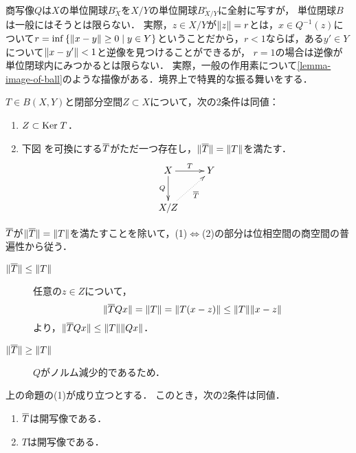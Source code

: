\documentclass[uplatex,dvipdfmx]{jsreport}
\begin{document}
\begin{remark}[連続延長の失敗と単位閉球のコンパクト性]
    商写像$Q$は$X$の単位開球$B_X^\circ$を$X/Y$の単位開球$B_{X/Y}^\circ$に全射に写すが，
    単位閉球$B$は一般にはそうとは限らない．
    実際，$z\in X/Y$が$\|z\|=r$とは，$x\in Q^{-1}(z)$について$r=\inf\left\{\|x-y\|\ge 0\mid y\in Y\right\}$ということだから，$r<1$ならば，ある$y'\in Y$について$\|x-y'\|<1$と逆像を見つけることができるが，
    $r=1$の場合は逆像が単位閉球内にみつかるとは限らない．
    実際，一般の作用素について\ref{lemma-image-of-ball}のような描像がある．境界上で特異的な振る舞いをする．
\end{remark}

\begin{proposition}[商空間の普遍性]
    $T\in B(X,Y)$と閉部分空間$Z\subset X$について，次の2条件は同値：
    \begin{enumerate}
        \item $Z\subset\mathrm{Ker}\; T$．
        \item 下図
        を可換にする$\overline{T}$がただ一つ存在し，$\|\overline{T}\|=\|T\|$を満たす．
        \[\xymatrix{
            X\ar[r]^-T\ar[d]_-Q&Y\\
            X/Z\ar@{.>}[ur]_-{\o{T}}
        }\]
    \end{enumerate}
\end{proposition}
\begin{Proof}
    $\overline{T}$が$\|\overline{T}\|=\|T\|$を満たすことを除いて，(1)$\Leftrightarrow$(2)の部分は位相空間の商空間の普遍性から従う．
    \begin{description}
        \item[$\|\overline{T}\|\le\|T\|$] 任意の$z\in Z$について，
        \[\|\overline{T}Qx\|=\|T\|=\|T(x-z)\|\le\|T\|\|x-z\|\]
        より，$\|\overline{T}Qx\|\le\|T\|\|Qx\|$．
        \item[$\|\overline{T}\|\ge\|T\|$] $Q$がノルム減少的であるため．
    \end{description}
\end{Proof}

\begin{proposition}
    上の命題の(1)が成り立つとする．
    このとき，次の2条件は同値．
    \begin{enumerate}
        \item $\overline{T}$は開写像である．
        \item $T$は開写像である．
    \end{enumerate}
\end{proposition}
\end{document}
